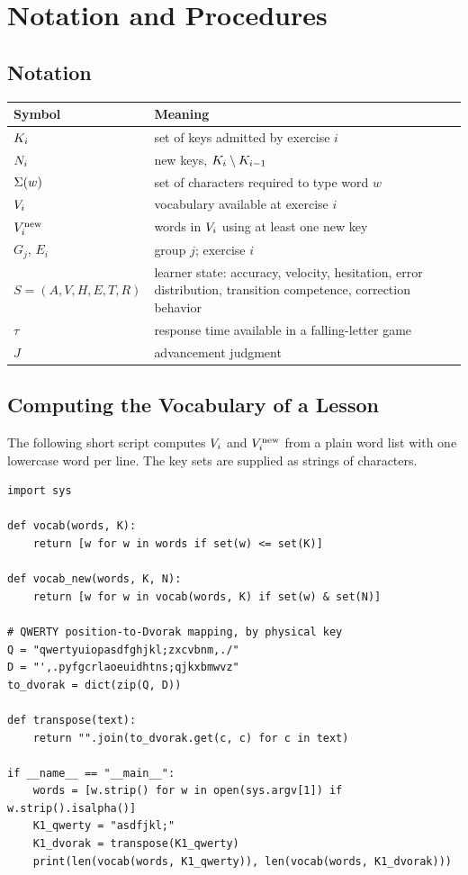 \chapter{Notation and Procedures}

\section{Notation}

\begin{center}
\begin{tabular}{@{}lp{9.5cm}@{}}
\toprule
Symbol & Meaning \\
\midrule
$K_i$ & set of keys admitted by exercise $i$ \\
$N_i$ & new keys, $K_i\setminus K_{i-1}$ \\
$\Sigma(w)$ & set of characters required to type word $w$ \\
$V_i$ & vocabulary available at exercise $i$ \\
$V_i^{\mathrm{new}}$ & words in $V_i$ using at least one new key \\
$G_j$, $E_i$ & group $j$; exercise $i$ \\
$S=(A,V,H,E,T,R)$ & learner state: accuracy, velocity, hesitation, error distribution, transition competence, correction behavior \\
$\tau$ & response time available in a falling-letter game \\
$J$ & advancement judgment \\
\bottomrule
\end{tabular}
\end{center}

\section{Computing the Vocabulary of a Lesson}

The following short script computes $V_i$ and $V_i^{\mathrm{new}}$ from a plain word list with one lowercase word per line. The key sets are supplied as strings of characters.

\begin{Verbatim}
import sys

def vocab(words, K):
    return [w for w in words if set(w) <= set(K)]

def vocab_new(words, K, N):
    return [w for w in vocab(words, K) if set(w) & set(N)]

# QWERTY position-to-Dvorak mapping, by physical key
Q = "qwertyuiopasdfghjkl;zxcvbnm,./"
D = "',.pyfgcrlaoeuidhtns;qjkxbmwvz"
to_dvorak = dict(zip(Q, D))

def transpose(text):
    return "".join(to_dvorak.get(c, c) for c in text)

if __name__ == "__main__":
    words = [w.strip() for w in open(sys.argv[1]) if w.strip().isalpha()]
    K1_qwerty = "asdfjkl;"
    K1_dvorak = transpose(K1_qwerty)
    print(len(vocab(words, K1_qwerty)), len(vocab(words, K1_dvorak)))
\end{Verbatim}


